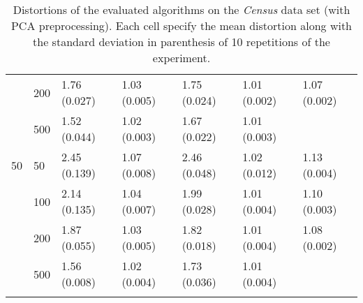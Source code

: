 \begin{longtable}{lllllll}
   & 200 &  1.76 (0.027) &   1.03 (0.005) &  1.75 (0.024) &         1.01 (0.002) &  1.07 (0.002) \\
   & 500 &  1.52 (0.044) &   1.02 (0.003) &  1.67 (0.022) &         1.01 (0.003) &  \\
 \midrule
50 & 50  &  2.45 (0.139) &   1.07 (0.008) &  2.46 (0.048) &         1.02 (0.012) &  1.13 (0.004) \\
   & 100 &  2.14 (0.135) &   1.04 (0.007) &  1.99 (0.028) &         1.01 (0.004) &  1.10 (0.003) \\
   & 200 &  1.87 (0.055) &   1.03 (0.005) &  1.82 (0.018) &         1.01 (0.004) &  1.08 (0.002) \\
   & 500 &  1.56 (0.008) &   1.02 (0.004) &  1.73 (0.036) &         1.01 (0.004) &            \\
\bottomrule
\caption{Distortions of the evaluated algorithms on the \textit{Census} data set (with PCA preprocessing). Each cell specify the mean distortion along with the standard deviation in parenthesis of 10 repetitions of the experiment.}
\label{tab:distortions-mean-std-census-pca}
\end{longtable}

